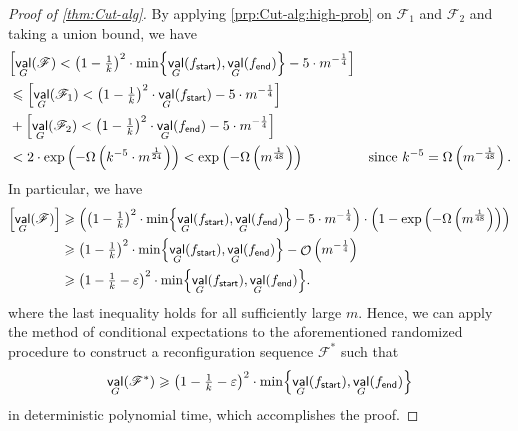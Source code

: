 \documentclass[11pt,fleqn]{article}
\renewcommand{\geq}{\geqslant}
\renewcommand{\leq}{\leqslant}
\renewcommand{\epsilon}{\varepsilon}
\let\E\relax\DeclareMathOperator*{\E}{\mathbb{E}}  \let\Pr\relax\DeclareMathOperator*{\Pr}{\mathbb{Pr}}
\DeclareMathOperator{\bigO}{\mathcal{O}}
\DeclareMathOperator{\val}{\mathsf{val}}
\newcommand{\sss}{\mathsf{start}}
\newcommand{\ttt}{\mathsf{end}}
\newcommand{\f}{f}
\newcommand{\sqcol}{\scrF}
\newcommand{\scrF}{\mathscr{F}}
\let\Pr\relax\DeclareMathOperator*{\Pr}{\mathbb{P}}
\theoremstyle{definition}
\numberwithin{equation}{section}
\begin{document}
\begin{proof}[Proof of \cref{thm:Cut-alg}]
By applying \cref{prp:Cut-alg:high-prob} on
$\sqcol_1$ and $\sqcol_2$ and
taking a union bound,
we have
\begin{align}
\begin{aligned}
    & \Pr\Bigl[
        \val_G(\sqcol)
        < \left(1 - \tfrac{1}{k}\right)^2 \cdot \min\Bigl\{\val_G(\f_\sss), \val_G(\f_\ttt)\Bigr\}
        - 5\cdot m^{-\frac{1}{4}}
    \Bigr] \\
    & \leq \Pr\Bigl[
        \val_G(\sqcol_1)
        < \left(1 - \tfrac{1}{k}\right)^2 \cdot \val_G(\f_\sss)
        - 5\cdot m^{-\frac{1}{4}}
    \Bigr] \\
    & + \Pr\Bigl[
        \val_G(\sqcol_2)
        < \left(1 - \tfrac{1}{k}\right)^2 \cdot \val_G(\f_\ttt)
        - 5\cdot m^{-\frac{1}{4}}
    \Bigr] \\
    & < 2 \cdot \exp\left(- \Omega\left(k^{-5} \cdot m^{\frac{1}{24}}\right)\right)
    < \exp\left( -\Omega\left( m^{\frac{1}{48}} \right) \right)
        & \text{since } k^{-5} = \Omega\left(m^{-\frac{1}{48}}\right).
\end{aligned}
\end{align}
In particular, we have
\begin{align}
\begin{aligned}
    \E\Bigl[
        \val_G(\sqcol)
    \Bigr]
    & \geq \left(
            \left(1 - \tfrac{1}{k}\right)^2 \cdot \min\Bigl\{\val_G(\f_\sss), \val_G(\f_\ttt)\Bigr\}
            - 5\cdot m^{-\frac{1}{4}}
        \right)
    \cdot \left(1 - \exp\left( -\Omega\left( m^{\frac{1}{48}} \right) \right)\right) \\
    & \geq \left(1 - \tfrac{1}{k}\right)^2 \cdot \min\Bigl\{\val_G(\f_\sss), \val_G(\f_\ttt)\Bigr\}
        - \bigO\left(m^{-\frac{1}{4}}\right) \\
    & \geq \left(1 - \tfrac{1}{k} -\epsilon\right)^2 \cdot \min\Bigl\{\val_G(\f_\sss), \val_G(\f_\ttt)\Bigr\}.
\end{aligned}
\end{align}
where the last inequality holds for all sufficiently large $m$.
Hence, we can apply the method of conditional expectations \cite{alon2016probabilistic}
to the aforementioned randomized procedure
to construct a reconfiguration sequence $\sqcol^*$ such that
\begin{align}
    \val_G(\sqcol^*)
    \geq \left(1-\tfrac{1}{k}-\epsilon\right)^2
    \cdot \min\Bigl\{\val_G(\f_\sss), \val_G(\f_\ttt)\Bigr\}
\end{align}
in deterministic polynomial time,
which accomplishes the proof.
\end{proof}
\end{document}
